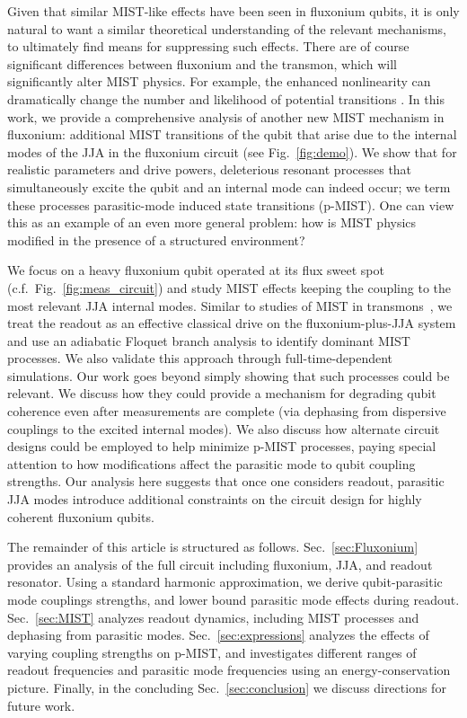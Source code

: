 \documentclass[%
reprint,
superscriptaddress,
 amsmath,amssymb,
 aps,
 prx,
longbibliography,
floatfix,
]{revtex4-2}
\begin{document}
Given that similar MIST-like effects have been seen in fluxonium qubits, it is only natural to want a similar theoretical understanding of the relevant mechanisms, to ultimately find means for suppressing such effects.  There are of course significant differences between fluxonium and the transmon, which will significantly alter MIST physics.  For example, the enhanced nonlinearity can dramatically change the number and likelihood of potential transitions \cite{nesterov2024measurement,xiao2023diagrammatic}.  In this work, we provide a comprehensive analysis of another new MIST mechanism in fluxonium:  additional MIST transitions of the qubit that arise due to the internal modes of the JJA in the fluxonium circuit (see Fig.~\ref{fig:demo}). We show that for realistic parameters and drive powers, deleterious resonant processes that simultaneously excite the qubit and an internal mode can indeed occur; we term these processes parasitic-mode induced state transitions (p-MIST).  One can view this as an example of an even more general problem: how is MIST physics modified in the presence of a structured environment?  

We focus on a heavy fluxonium qubit operated at its flux sweet spot (c.f.~Fig.~\ref{fig:meas_circuit}) and study MIST effects keeping the coupling to the most relevant JJA internal modes.  Similar to studies of MIST in transmons~\cite{cohen2023reminiscence,dumas2024unified}, we treat the readout as an effective classical drive on the fluxonium-plus-JJA system and use an adiabatic Floquet branch analysis to identify dominant MIST processes. We also validate this approach through full-time-dependent simulations.  
Our work goes beyond simply showing that such processes could be relevant.  We discuss how they could provide a mechanism for degrading qubit coherence even after measurements are complete (via dephasing from dispersive couplings to the excited internal modes).  We also discuss how alternate circuit designs could be employed to help minimize p-MIST processes, paying special attention to how modifications affect the parasitic mode to qubit coupling strengths.  Our analysis here suggests that once one considers readout, parasitic JJA modes introduce additional constraints on the circuit design for highly coherent fluxonium qubits.     

The remainder of this article is structured as follows. Sec.~\ref{sec:Fluxonium}
provides an analysis of the full circuit including fluxonium, JJA, and readout resonator.  Using a standard harmonic approximation, we derive qubit-parasitic mode couplings strengths, and lower bound parasitic mode effects during readout. Sec.~\ref{sec:MIST} analyzes readout dynamics, including MIST processes and dephasing from parasitic modes. Sec.~\ref{sec:expressions} analyzes the effects of varying coupling strengths on p-MIST, and investigates different ranges of readout frequencies and parasitic mode frequencies using an energy-conservation picture. Finally, in the concluding Sec.~\ref{sec:conclusion} we discuss directions for future work.
\end{document}
